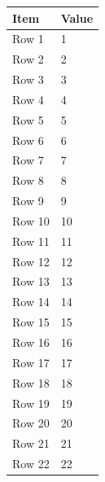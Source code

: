 \begin{longtable}{ll}
\toprule
Item & Value \\
\midrule
\endhead
Row 1 & 1 \\
Row 2 & 2 \\
Row 3 & 3 \\
Row 4 & 4 \\
Row 5 & 5 \\
Row 6 & 6 \\
Row 7 & 7 \\
Row 8 & 8 \\
Row 9 & 9 \\
Row 10 & 10 \\
Row 11 & 11 \\
Row 12 & 12 \\
Row 13 & 13 \\
Row 14 & 14 \\
Row 15 & 15 \\
Row 16 & 16 \\
Row 17 & 17 \\
Row 18 & 18 \\
Row 19 & 19 \\
Row 20 & 20 \\
Row 21 & 21 \\
Row 22 & 22 \\
\bottomrule
\end{longtable}

